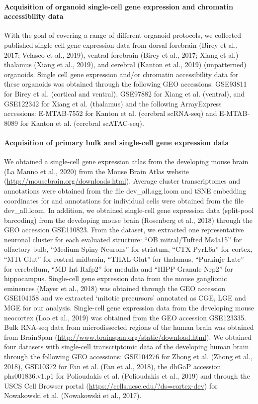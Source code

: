 \paragraph{Acquisition of organoid single-cell gene expression and chromatin accessibility data}
With the goal of covering a range of different organoid protocols, we collected published single cell gene expression data from dorsal forebrain (Birey et al., 2017; Velasco et al., 2019), ventral forebrain (Birey et al., 2017; Xiang et al.) thalamus (Xiang et al., 2019), and cerebral (Kanton et al., 2019) (unpatterned) organoids. Single cell gene expression and/or chromatin accessibility data for these organoids was obtained through the following GEO accessions: GSE93811 for Birey et al. (cortical and ventral), GSE97882 for Xiang et al. (ventral), and GSE122342 for Xiang et al. (thalamus) and the following ArrayExpress accessions: E-MTAB-7552 for Kanton et al. (cerebral scRNA-seq) and E-MTAB-8089 for Kanton et al. (cerebral scATAC-seq). 

\paragraph{Acquisition of primary bulk and single-cell gene expression data}
We obtained a single-cell gene expression atlas from the developing mouse brain (La Manno et al., 2020) from the Mouse Brain Atlas website (\href{http://mousebrain.org/downloads.html}{http://mousebrain.org/downloads.html}). Average cluster transcriptomes and annotations were obtained from the file dev\_all.agg.loom and tSNE embedding coordinates for and annotations for individual cells were obtained from the file dev\_all.loom. In addition, we obtained single-cell gene expression data (split-pool barcoding) from the developing mouse brain (Rosenberg et al., 2018) through the GEO accession GSE110823. From the dataset, we extracted one representative neuronal cluster for each evaluated structure: “OB mitral/Tufted Ms4a15” for olfactory bulb, “Medium Spiny Neurons” for striatum, “CTX PyrL6a” for cortex, “MTt Glut” for rostral midbrain, “THAL Glut” for thalamus, “Purkinje Late” for cerebellum, “MD Int Rxfp2” for medulla and “HIPP Granule Nrp2” for hippocampus. Single-cell gene expression data from the mouse ganglionic eminences (Mayer et al., 2018) was obtained through the GEO accession GSE104158 and we extracted ‘mitotic precursors’ annotated as CGE, LGE and MGE for our analysis. Single-cell gene expression data from the developing mouse neocortex (Loo et al., 2019) was obtained from the GEO accession GSE123335. Bulk RNA-seq data from microdissected regions of the human brain was obtained from BrainSpan (\href{http://www.brainspan.org/static/download.html}{http://www.brainspan.org/static/download.html}). We obtained four datasets with single-cell transcriptomic data of the developing human brain through the following GEO accessions: GSE104276 for Zhong et al. (Zhong et al., 2018), GSE10372 for Fan et al. (Fan et al., 2018), the dbGaP accession phs001836.v1.p1 for Polioudakis et al. (Polioudakis et al., 2019) and through the USCS Cell Browser portal (\href{https://cells.ucsc.edu/?ds=cortex-dev}{https://cells.ucsc.edu/?ds=cortex-dev}) for Nowakowski et al. (Nowakowski et al., 2017).  

